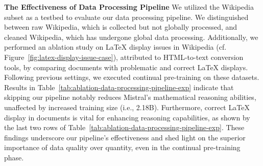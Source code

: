 \begin{table}[ht]
\caption{Ablation study on data processing pipeline and LaTeX display issue resolution}
\label{tab:ablation-data-processing-pipeline-exp}

\end{table}

\noindent\textbf{The Effectiveness of Data Processing Pipeline} \quad We utilized the Wikipedia subset as a testbed to evaluate our data processing pipeline. We distinguished between raw Wikipedia, which is collected but not globally processed, and cleaned Wikipedia, which has undergone global data processing. Additionally, we performed an ablation study on LaTeX display issues in Wikipedia (cf. Figure~\ref{fig:latex-display-issue-case}), attributed to HTML-to-text conversion tools, by comparing documents with problematic and correct LaTeX displays. Following previous settings, we executed continual pre-training on these datasets. Results in Table~\ref{tab:ablation-data-processing-pipeline-exp} indicate that skipping our pipeline notably reduces Mistral's mathematical reasoning abilities, unaffected by increased training size (i.e., 2.18B). Furthermore, correct LaTeX display in documents is vital for enhancing reasoning capabilities, as shown by the last two rows of Table~\ref{tab:ablation-data-processing-pipeline-exp}. These findings underscore our pipeline's effectiveness and shed light on the superior importance of data quality over quantity, even in the continual pre-training phase.

